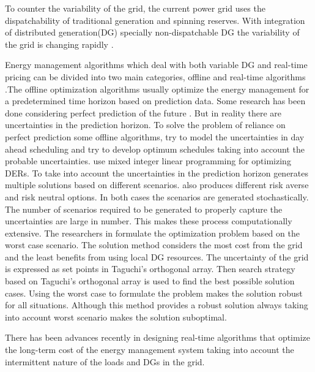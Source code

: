

To counter the variability of the grid, the current power grid uses the dispatchability of traditional generation and spinning reserves. With integration of distributed generation(DG) specially non-dispatchable DG the variability of the grid is changing rapidly \cite{denholm2016path}. 

Energy management algorithms which deal with both variable DG and real-time pricing can be divided into two main categories, offline and real-time algorithms \cite{rt_shi_2017}.The offline optimization algorithms usually optimize the energy management for a predetermined time horizon based on prediction data. Some research has been done considering perfect prediction of the future \cite{Off_1,off_2,off_3,off_4}. But in reality there are uncertainties in the prediction horizon. To solve the problem of reliance on perfect prediction some offline algorithms, try to model the uncertainties in day ahead scheduling and try to develop optimum schedules taking into account the probable uncertainties. \cite{ous_1,ous_2} use mixed integer linear programming for optimizing DERs. To take into account the uncertainties in the prediction horizon \cite{ous_2} generates multiple solutions based on different scenarios. \cite{ous_1} also produces different risk averse and risk neutral options. In both cases the scenarios are generated stochastically. The number of scenarios required to be generated to properly capture the uncertainties are large in number. This makes these process computationally extensive. The researchers in \cite{ous_3} formulate the optimization problem based on the worst case scenario. The solution method considers the most cost from the grid and the least benefits from using local DG resources. The uncertainty of the grid is expressed as set points in Taguchi’s orthogonal array. Then search strategy based on Taguchi’s orthogonal array is used to find the best possible solution cases. Using the worst case to formulate the problem makes the solution robust for all situations. Although this method provides a robust solution always taking into account worst scenario makes the solution suboptimal. 

There has been advances recently in designing real-time algorithms that optimize the long-term cost of the energy management system taking into account the intermittent nature of the loads and DGs in the grid. 


